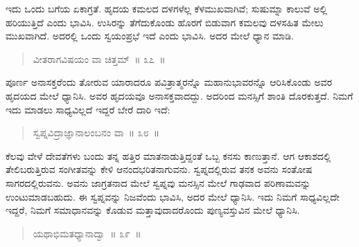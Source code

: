 
\vspace{0.2cm}

ಇದು ಒಂದು ಬಗೆಯ ಏಕಾಗ್ರತೆ. ಹೃದಯ ಕಮಲದ ದಳಗಳೆಲ್ಲ ಕೆಳಮುಖವಾಗಿವೆ; ಸುಷುಮ್ನಾ ಕಾಲುವೆ ಅಲ್ಲಿ ಹರಿಯುತ್ತಿದೆ ಎಂದು ಭಾವಿಸಿ. ಉಸಿರನ್ನು ತೆಗೆದುಕೊಂಡು ಹೊರಗೆ ಬಿಡುವಾಗ ಕಮಲವು ದಳಸಹಿತ ಮೇಲು ಮುಖವಾಗಿದೆ. ಅದರಲ್ಲಿ ಒಂದು ಸ್ವಯಂಪ್ರಭೆ ಇದೆ ಎಂದು ಭಾವಿಸಿ. ಅದರ ಮೇಲೆ ಧ್ಯಾನ ಮಾಡಿ. 

\vspace{-0.1cm}

\begin{verse}
ವೀತರಾಗವಿಷಯಂ ವಾ ಚಿತ್ತಮ್​~॥ ೩೭~॥
\end{verse}

\vspace{-0.4cm}


\vspace{0.2cm}

ಪೂರ್ಣ ಅನಾಸಕ್ತರೆಂದು ತೋರುವ ಯಾರಾದರೂ ಪವಿತ್ರಾತ್ಮರನ್ನೊ ಮಹಾನುಭಾವರನ್ನೊ ಆರಿಸಿಕೊಂಡು ಅವರ ಹೃದಯದ ಮೇಲೆ ಧ್ಯಾನಿಸಿ. ಅವರ ಹೃದಯವೂ ಅನಾಸಕ್ತವಾದದ್ದು. ಅದರಿಂದ ಮನಸ್ಸಿಗೆ ಶಾಂತಿ ದೊರಕುತ್ತದೆ. ನಿಮಗೆ ಇದು ಮಾಡಲು ಸಾಧ್ಯವಿಲ್ಲದೆ ಇದ್ದರೆ ಬೇರೆ ದಾರಿ ಇದೆ:

\vspace{-0.1cm}

\begin{verse}
ಸ್ವಪ್ನವಿದ್ರಾಜ್ಞಾನಾಲಂಬನಂ ವಾ~॥ ೩೮~॥
\end{verse}

\vspace{-0.4cm}


\newpage

ಕೆಲವು ವೇಳೆ ದೇವತೆಗಳು ಬಂದು ತನ್ನ ಹತ್ತಿರ ಮಾತನಾಡುತ್ತಿದ್ದಂತೆ ಒಬ್ಬ ಕನಸು ಕಾಣುತ್ತಾನೆ. ಆಗ ಆಕಾಶದಲ್ಲಿ ತೇಲಿಬರುತ್ತಿರುವ ಸಂಗೀತವನ್ನು ಕೇಳಿ ಆನಂದಭರಿತನಾಗುವನು. ಸ್ವಪ್ನದಲ್ಲಿರುವ ತನಕ ಅವನು ಸಂತೋಷ ಸಾಗರದಲ್ಲಿರುವನು. ಅವನು ಜಾಗ್ರತನಾದ ಮೇಲೆ ಸ್ವಪ್ನವು ಮನಸ್ಸಿನ ಮೇಲೆ ಗಾಢವಾದ ಪರಿಣಾಮವನ್ನು ಉಂಟುಮಾಡಬಹುದು. ಈ ಸ್ವಪ್ನವನ್ನು ನಿಜವೆಂದು ಭಾವಿಸಿ, ಅದರ ಮೇಲೆ ಧ್ಯಾನಿಸಿ. ಇದು ನಿಮಗೆ ಸಾಧ್ಯವಿಲ್ಲದೇ ಇದ್ದರೆ, ನಿಮಗೆ ಸಮಾಧಾನವನ್ನು ಕೊಡುವ ಮತ್ತಾವುದಾದರೊಂದು ಪುಣ್ಯವಸ್ತುವಿನ ಮೇಲೆ ಧ್ಯಾನಿಸಿ. 

\vspace{-0.29cm}

\begin{verse}
ಯಥಾಭಿಮತಧ್ಯಾನಾದ್ವಾ~॥ ೩೯~॥
\end{verse}

\vspace{-0.4cm}

